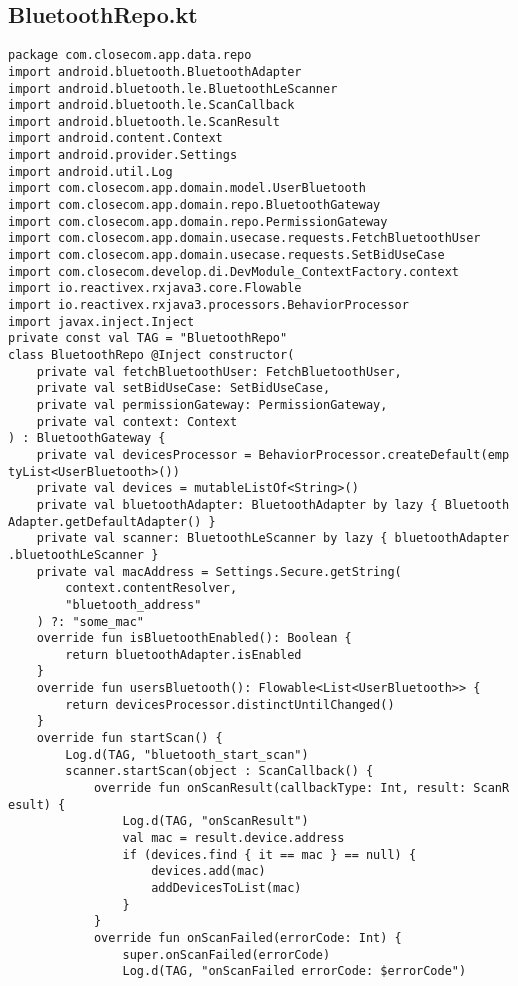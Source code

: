 \documentclass[listing]{espd}
\begin{document}
\subsection{BluetoothRepo.kt}
\begin{verbatim}
package com.closecom.app.data.repo
import android.bluetooth.BluetoothAdapter
import android.bluetooth.le.BluetoothLeScanner
import android.bluetooth.le.ScanCallback
import android.bluetooth.le.ScanResult
import android.content.Context
import android.provider.Settings
import android.util.Log
import com.closecom.app.domain.model.UserBluetooth
import com.closecom.app.domain.repo.BluetoothGateway
import com.closecom.app.domain.repo.PermissionGateway
import com.closecom.app.domain.usecase.requests.FetchBluetoothUser
import com.closecom.app.domain.usecase.requests.SetBidUseCase
import com.closecom.develop.di.DevModule_ContextFactory.context
import io.reactivex.rxjava3.core.Flowable
import io.reactivex.rxjava3.processors.BehaviorProcessor
import javax.inject.Inject
private const val TAG = "BluetoothRepo"
class BluetoothRepo @Inject constructor(
    private val fetchBluetoothUser: FetchBluetoothUser,
    private val setBidUseCase: SetBidUseCase,
    private val permissionGateway: PermissionGateway,
    private val context: Context
) : BluetoothGateway {
    private val devicesProcessor = BehaviorProcessor.createDefault(emp
tyList<UserBluetooth>())
    private val devices = mutableListOf<String>()
    private val bluetoothAdapter: BluetoothAdapter by lazy { Bluetooth
Adapter.getDefaultAdapter() }
    private val scanner: BluetoothLeScanner by lazy { bluetoothAdapter
.bluetoothLeScanner }
    private val macAddress = Settings.Secure.getString(
        context.contentResolver,
        "bluetooth_address"
    ) ?: "some_mac"
    override fun isBluetoothEnabled(): Boolean {
        return bluetoothAdapter.isEnabled
    }
    override fun usersBluetooth(): Flowable<List<UserBluetooth>> {
        return devicesProcessor.distinctUntilChanged()
    }
    override fun startScan() {
        Log.d(TAG, "bluetooth_start_scan")
        scanner.startScan(object : ScanCallback() {
            override fun onScanResult(callbackType: Int, result: ScanR
esult) {
                Log.d(TAG, "onScanResult")
                val mac = result.device.address
                if (devices.find { it == mac } == null) {
                    devices.add(mac)
                    addDevicesToList(mac)
                }
            }
            override fun onScanFailed(errorCode: Int) {
                super.onScanFailed(errorCode)
                Log.d(TAG, "onScanFailed errorCode: $errorCode")

\end{verbatim}
\end{document}
